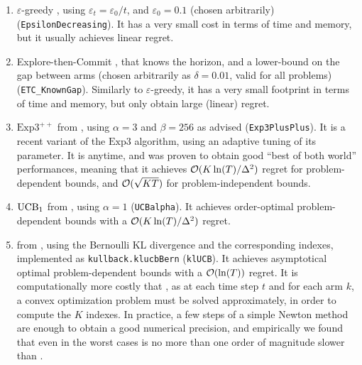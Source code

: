 \begin{enumerate}
    \item
    $\varepsilon$-greedy \cite{Bubeck12}, using $\varepsilon_t = \varepsilon_0 / t$, and $\varepsilon_0 = 0.1$ (chosen arbitrarily) (\texttt{EpsilonDecreasing}).
    It has a very small cost in terms of time and memory, but it usually achieves linear regret.

    \item
    Explore-then-Commit \cite{GarivierETC2016}, that knows the horizon, and a lower-bound on the gap between arms (chosen arbitrarily as $\delta=0.01$, valid for all problems) (\texttt{ETC\_KnownGap}).
    Similarly to $\varepsilon$-greedy, it has a very small footprint in terms of time and memory, but only obtain large (linear) regret.

    \item
    $\mathrm{Exp}3^{++}$ from \cite{Seldin17}, using $\alpha=3$ and $\beta=256$ as advised (\texttt{Exp3PlusPlus}).
    It is a recent variant of the $\mathrm{Exp3}$ algorithm, using an adaptive tuning of its parameter. It is anytime, and was proven to obtain good ``best of both world'' performances, meaning that it achieves $\mathcal{O}(K\ln(T)/\Delta^2)$ regret for problem-dependent bounds, and $\mathcal{O}(\sqrt{KT})$ for problem-independent bounds.

    \item
    $\mathrm{UCB}_1$ from \cite{Auer02}, using $\alpha=1$ (\texttt{UCBalpha}).
    It achieves order-optimal problem-dependent bounds with a $\mathcal{O}(K\ln(T)/\Delta^2)$ regret.

    \item
    \klUCB{} from \cite{KLUCBJournal}, using the Bernoulli KL divergence and the corresponding \klUCB{} indexes, implemented as \texttt{kullback.klucbBern} (\texttt{klUCB}).
    It achieves asymptotical optimal problem-dependent bounds with a $\mathcal{O}(\ln(T))$ regret.
    It is computationally more costly that \UCB, as at each time step $t$ and for each arm $k$, a convex optimization problem must be solved approximately, in order to compute the $K$ indexes.
    In practice, a few steps of a simple Newton method are enough to obtain a good numerical precision, and empirically we found that even in the worst cases \klUCB{} is no more than one order of magnitude slower than \UCB.


\end{enumerate}
